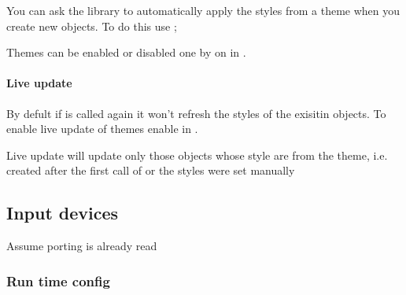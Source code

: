 \documentclass[letterpaper,10pt,english]{sphinxmanual}
\begin{document}
You can ask the library to automatically apply the styles from a theme when you create new objects. To do this use ;

\begin{sphinxVerbatim}[commandchars=\\\{\}]
    

   
\end{sphinxVerbatim}

Themes can be enabled or disabled one by on in .


\paragraph{Live update}
\label{\detokenize{overview/styles:live-update}}
By defult if  is called again it won’t refresh the styles of the exisitin objects. To enable live update of themes enable  in .

Live update will update only those objects whose style are from the theme, i.e. created after the first call of  or the styles were set manually


\subsection{Input devices}
\label{\detokenize{overview/indev:input-devices}}\label{\detokenize{overview/indev::doc}}
Assume porting is already read


\subsubsection{Run time config}
\label{\detokenize{overview/indev:run-time-config}}
\end{document}
